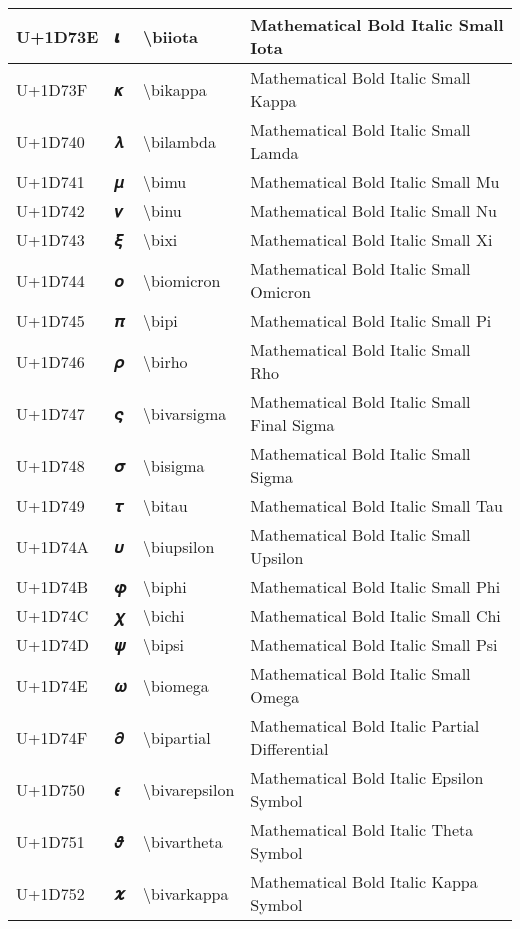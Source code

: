 \begin{table}[h]
\begin{tabulary}{\linewidth}{|L|L|L|L|}
\hline
U+1D73E & 𝜾 & {\textbackslash}biiota & Mathematical Bold Italic Small Iota \\
\hline
U+1D73F & 𝜿 & {\textbackslash}bikappa & Mathematical Bold Italic Small Kappa \\
\hline
U+1D740 & 𝝀 & {\textbackslash}bilambda & Mathematical Bold Italic Small Lamda \\
\hline
U+1D741 & 𝝁 & {\textbackslash}bimu & Mathematical Bold Italic Small Mu \\
\hline
U+1D742 & 𝝂 & {\textbackslash}binu & Mathematical Bold Italic Small Nu \\
\hline
U+1D743 & 𝝃 & {\textbackslash}bixi & Mathematical Bold Italic Small Xi \\
\hline
U+1D744 & 𝝄 & {\textbackslash}biomicron & Mathematical Bold Italic Small Omicron \\
\hline
U+1D745 & 𝝅 & {\textbackslash}bipi & Mathematical Bold Italic Small Pi \\
\hline
U+1D746 & 𝝆 & {\textbackslash}birho & Mathematical Bold Italic Small Rho \\
\hline
U+1D747 & 𝝇 & {\textbackslash}bivarsigma & Mathematical Bold Italic Small Final Sigma \\
\hline
U+1D748 & 𝝈 & {\textbackslash}bisigma & Mathematical Bold Italic Small Sigma \\
\hline
U+1D749 & 𝝉 & {\textbackslash}bitau & Mathematical Bold Italic Small Tau \\
\hline
U+1D74A & 𝝊 & {\textbackslash}biupsilon & Mathematical Bold Italic Small Upsilon \\
\hline
U+1D74B & 𝝋 & {\textbackslash}biphi & Mathematical Bold Italic Small Phi \\
\hline
U+1D74C & 𝝌 & {\textbackslash}bichi & Mathematical Bold Italic Small Chi \\
\hline
U+1D74D & 𝝍 & {\textbackslash}bipsi & Mathematical Bold Italic Small Psi \\
\hline
U+1D74E & 𝝎 & {\textbackslash}biomega & Mathematical Bold Italic Small Omega \\
\hline
U+1D74F & 𝝏 & {\textbackslash}bipartial & Mathematical Bold Italic Partial Differential \\
\hline
U+1D750 & 𝝐 & {\textbackslash}bivarepsilon & Mathematical Bold Italic Epsilon Symbol \\
\hline
U+1D751 & 𝝑 & {\textbackslash}bivartheta & Mathematical Bold Italic Theta Symbol \\
\hline
U+1D752 & 𝝒 & {\textbackslash}bivarkappa & Mathematical Bold Italic Kappa Symbol \\

\end{tabulary}
\end{table}
